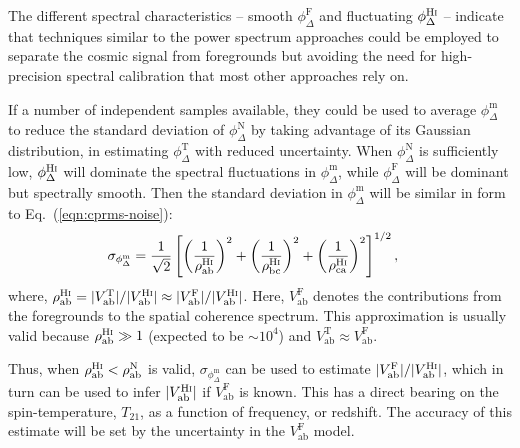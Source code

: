 \documentclass[
reprint,
superscriptaddress,
amsmath,
amssymb,
aps,
prd
]{revtex4-1}
\begin{document}
The different spectral characteristics -- smooth $\phi_\Delta^\textrm{F}$ and fluctuating $\phi_\Delta^\textrm{H{\sc i}}$ -- indicate that techniques similar to the power spectrum approaches could be employed to separate the cosmic signal from foregrounds but avoiding the need for high-precision spectral calibration that most other approaches rely on.

If a number of independent samples available, they could be used to average $\phi_\Delta^\textrm{m}$ to reduce the standard deviation of $\phi_\Delta^\textrm{N}$ by taking advantage of its Gaussian distribution, in estimating $\phi_\Delta^\textrm{T}$ with reduced uncertainty. When $\phi_\Delta^\textrm{N}$ is sufficiently low, $\phi_\Delta^\textrm{H{\sc i}}$ will dominate the spectral fluctuations in $\phi_\Delta^\textrm{m}$, while $\phi_\Delta^\textrm{F}$ will be dominant but spectrally smooth. Then the standard deviation in $\phi_\Delta^\textrm{m}$ will be similar in form to Eq.~(\ref{eqn:cprms-noise}):
\begin{align}
  \sigma_{\phi_\Delta^\textrm{m}} &= \frac{1}{\sqrt{2}}\left[\left(\frac{1}{\rho_\textrm{ab}^\textrm{H{\sc i}}}\right)^2 + \left(\frac{1}{\rho_\textrm{bc}^\textrm{H{\sc i}}}\right)^2 + \left(\frac{1}{\rho_\textrm{ca}^\textrm{H{\sc i}}}\right)^2\right]^{1/2}, \label{eqn:cprms-EoR}
\end{align}
where, $\rho_\textrm{ab}^\textrm{H{\sc i}} = |V_\textrm{ab}^\textrm{T}|/|V_\textrm{ab}^\textrm{H{\sc i}}| \approx |V_\textrm{ab}^\textrm{F}|/|V_\textrm{ab}^\textrm{H{\sc i}}|$. Here, $V_\textrm{ab}^\textrm{F}$ denotes the contributions from the foregrounds to the spatial coherence spectrum. This approximation is usually valid because $\rho_\textrm{ab}^\textrm{H{\sc i}} \gg 1$ (expected to be $\sim 10^4$) and $V_\textrm{ab}^\textrm{T} \approx V_\textrm{ab}^\textrm{F}$. 

Thus, when $\rho_\textrm{ab}^\textrm{H{\sc i}} < \rho_\textrm{ab}^\textrm{N}$ is valid, $\sigma_{\phi_\Delta^\textrm{m}}$ can be used to estimate $|V_\textrm{ab}^\textrm{F}|/|V_\textrm{ab}^\textrm{H{\sc i}}|$, which in turn can be used to infer $|V_\textrm{ab}^\textrm{H{\sc i}}|$ if $V_\textrm{ab}^\textrm{F}$ is known. This has a direct bearing on the spin-temperature, $T_{21}$, as a function of frequency, or redshift. The accuracy of this estimate will be set by the uncertainty in the $V_\textrm{ab}^\textrm{F}$ model.

\end{document}
